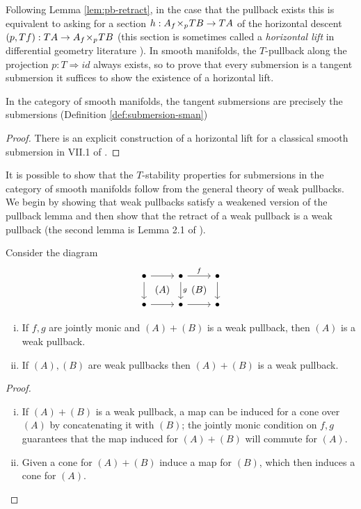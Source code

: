 Following Lemma \ref{lem:pb-retract}, in the case that the pullback exists this is equivalent to asking for a section $h: A {_{f}}\!\times_{p}\! TB \to TA$ of the horizontal descent $(p,Tf): TA \to A {_{f}}\!\times_{p}\! TB$ (this section is sometimes called a \textit{horizontal lift} in differential geometry literature \cite{Cordero1989}). 
In smooth manifolds, the $T$-pullback along the projection $p:T \Rightarrow id$ always exists, so to prove that every submersion is a tangent submersion it suffices to show the existence of a horizontal lift.
\begin{proposition}
    In the category of smooth manifolds, the tangent submersions are precisely the submersions (Definition \ref{def:submersion-sman})
\end{proposition}
\begin{proof}
    There is an explicit construction of a horizontal lift for a classical smooth submersion in VII.1 of \cite{Cushman2015}.
\end{proof}
It is possible to show that the $T$-stability properties for submersions in the category of smooth manifolds follow from the general theory of weak pullbacks.
We begin by showing that weak pullbacks satisfy a weakened version of the pullback lemma and then show that the retract of a weak pullback is a weak pullback (the second lemma is Lemma 2.1 of \cite{Adamek2010}).
\begin{lemma}\label{lem:weak-pullback}
    Consider the diagram
    \[
        \begin{tikzcd}
            \bullet \rar \dar \ar[rd, phantom, "(A)"] & \bullet \rar{f}\dar{g} \ar[rd, phantom, "(B)"] & \bullet\dar \\
            \bullet \rar & \bullet \rar & \bullet 
        \end{tikzcd}
    \]
    \begin{enumerate}[(i)]
        \item If $f,g$ are jointly monic and $(A)+(B)$ is a weak pullback, then $(A)$ is a weak pullback.
        \item If $(A),(B)$ are weak pullbacks then $(A)+(B)$ is a weak pullback.
    \end{enumerate}
\end{lemma}    
\begin{proof}
    ~\begin{enumerate}[(i)]
        \item If $(A)+(B)$ is a weak pullback, a map can be induced for a cone over $(A)$ by concatenating it with $(B)$; the jointly monic condition on $f,g$ guarantees that the map induced for $(A)+(B)$ will commute for $(A)$. 
        \item Given a cone for $(A)+(B)$ induce a map for $(B)$, which then induces a cone for $(A)$.
    \end{enumerate}
\end{proof}

